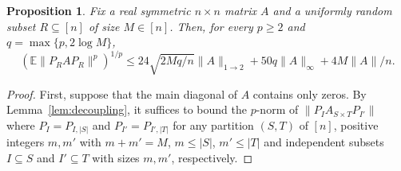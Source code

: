 \documentclass[reqno,a4paper]{amsart}
\newtheorem{proposition}[theorem]{Proposition}
\theoremstyle{definition}
\begin{document}
\begin{proposition}\label{prop:fixed68}
Fix a real symmetric $n\times n$ matrix $A$ and a uniformly random subset $R\subseteq [n]$ of size $M\in [n]$. Then, for every $p\ge 2$ and $q=\max\{p,2\log M\}$,
\begin{equation}\label{eq:fixed68}
        (\mathbb E\|P_RAP_R\|^p)^{1/p}
        \le
        24\sqrt{2Mq/n} \|A\|_{1\to 2}
        +50q\|A\|_{\infty} + 4M\|A\|/n.
\end{equation}
\end{proposition}

\begin{proof}
First, suppose that the main diagonal of $A$ contains only zeros. By Lemma~\ref{lem:decoupling}, it suffices to bound the $p$-norm of $\|P_IA_{S\times T}P_{I'}\|$ where $P_I=P_{I,|S|}$ and $P_{I'}=P_{I',|T|}$ for any partition $(S,T)$ of $[n]$, 
positive integers $m,m'$ with $m+m'=M$, $m\le |S|$, $m'\le |T| $ and independent subsets $I\subseteq S$ and $I'\subseteq T$ with sizes $m,m'$, respectively. 


\end{proof}
\end{document}
